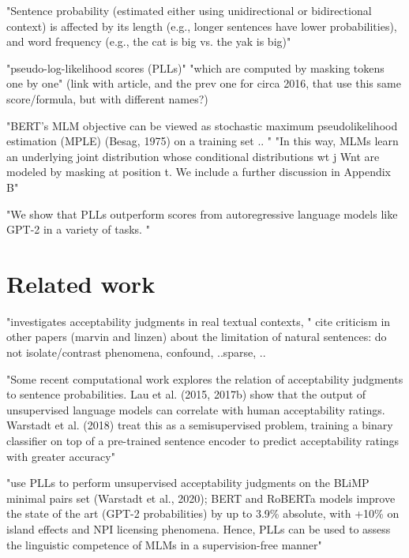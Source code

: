 "Sentence probability (estimated either using
unidirectional or bidirectional context) is affected
by its length (e.g., longer sentences have lower
probabilities), and word frequency (e.g., the cat is
big vs. the yak is big)" \citep{lau2020furiously}


"pseudo-log-likelihood scores (PLLs)" "which are computed by masking tokens one by one" \citep{salazar2020masked}
(link with \citet{lau2020furiously} article, and the prev one for circa 2016, that use this same score/formula, but with different names?)

"BERT’s MLM objective can be viewed as stochastic maximum pseudolikelihood estimation (MPLE) \citet{wang2019bert}(Besag, 1975) on a training set  .. " \citep{salazar2020masked}
"In this way, MLMs learn an underlying joint distribution whose conditional distributions wt j Wnt are modeled by masking at position t. We include
a further discussion in Appendix B" \citep{salazar2020masked}

"We show that PLLs outperform scores from autoregressive language models like GPT-2 in a variety of tasks. " \citep{salazar2020masked}

\pagebreak



\chapter{Related work}


"investigates acceptability judgments in real textual contexts, " \citep{lau2020furiously} 
cite criticism in other papers (marvin and linzen) about the limitation of natural sentences: do not isolate/contrast phenomena, confound, ..sparse, ..

"Some recent computational work explores the
relation of acceptability judgments to sentence
probabilities. Lau et al. (2015, 2017b) show that
the output of unsupervised language models
can correlate with human acceptability ratings.
Warstadt et al. (2018) treat this as a semisupervised problem, training a binary classifier
on top of a pre-trained sentence encoder to
predict acceptability ratings with greater accuracy"\citep{lau2020furiously} 

\citet{salazar2020masked}  "use PLLs to perform unsupervised acceptability judgments on the BLiMP minimal pairs set (Warstadt et al., 2020); BERT and RoBERTa models improve the state of the art (GPT-2 probabilities)
by up to 3.9\% absolute, with +10\% on island effects and NPI licensing phenomena. Hence, PLLs can be used to assess the linguistic competence of
MLMs in a supervision-free manner"



